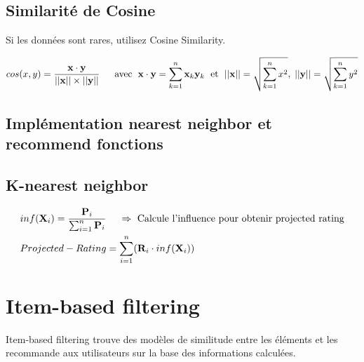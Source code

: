 \documentclass[11pt,fleqn]{book} %
\begin{document}
\subsection{Similarité de Cosine}
Si les données sont rares, utilisez Cosine Similarity.
\vspace{3mm}
\begin{theorem}
\begin{align}
    cos(x,y) =\dfrac{\mathbf{x} \cdot \mathbf{y}}{||\mathbf{x}|| \times ||\mathbf{y}||}
   \quad{\hspace{2mm} \text{avec \hspace{1mm}} \mathbf{x} \cdot \mathbf{y} = \sum_{k=1}^n\mathbf{x}_k\mathbf{y}_k \text{\hspace{1mm} et \hspace{1mm}} ||\mathbf{x}|| = \sqrt{\sum_{k=1}^nx^2},\hspace{1mm} ||\mathbf{y}|| = \sqrt{\sum_{k=1}^ny^2}}
\end{align}
\end{theorem}


\subsection{Implémentation nearest neighbor et recommend fonctions}
\subsection{K-nearest neighbor }
\vspace{3mm}
\begin{theorem}
\begin{align}
    & inf(\mathbf{X}_i) =\dfrac{\mathbf{P}_i}{\sum_{i=1}^n\mathbf{P}_i}
   \quad{\hspace{2mm} \Rightarrow{\text{ Calcule l'influence pour obtenir projected rating}}}\\
   & Projected-Rating =\sum_{i=1}^n(\mathbf{R}_i \cdot inf(\mathbf{X}_i))
\end{align}
\end{theorem}
\section{Item-based filtering}
Item-based filtering trouve des modèles de similitude entre les éléments et les recommande aux utilisateurs sur la base des informations calculées.
\end{document}
